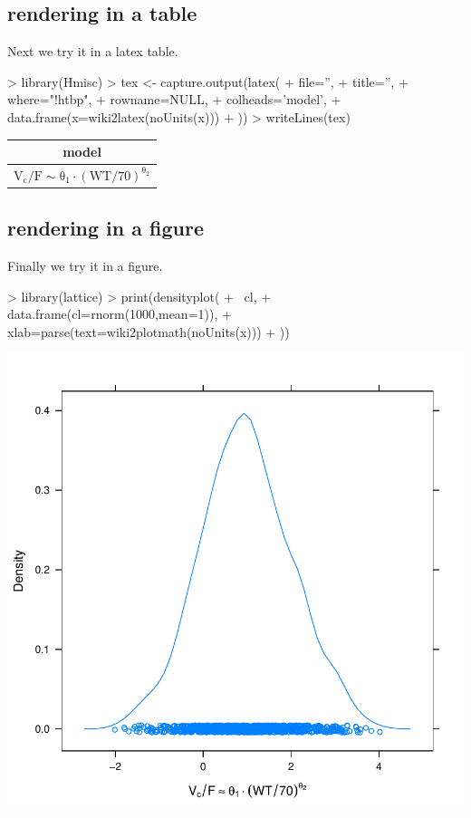 \documentclass[titlepage]{article}
\begin{document}
\subsection{rendering in a table}
Next we try it in a latex table.
\begin{Schunk}
\begin{Sinput}
> library(Hmisc)
> tex <- capture.output(latex(
+   file='',
+   title='',
+   where="!htbp",
+   rowname=NULL,
+   colheads='model',
+   data.frame(x=wiki2latex(noUnits(x)))
+ ))
> writeLines(tex)
\end{Sinput}
%
\begin{table}[!htbp]
 \begin{center}
 \begin{tabular}{l}\hline\hline
\multicolumn{1}{c}{model}\tabularnewline
\hline
$\mathrm{V_{c}/F  \sim\theta_{1}\cdot(WT/70)^{\theta_{2}}}$\tabularnewline
\hline
\end{tabular}

\end{center}

\end{table}\end{Schunk}
\subsection{rendering in a figure}
Finally we try it in a figure.
\begin{Schunk}
\begin{Sinput}
> library(lattice)
> print(densityplot(
+   ~cl,
+   data.frame(cl=rnorm(1000,mean=1)),
+   xlab=parse(text=wiki2plotmath(noUnits(x)))
+ ))
\end{Sinput}
\end{Schunk}
\includegraphics{wikimath-figure}
\end{document}
